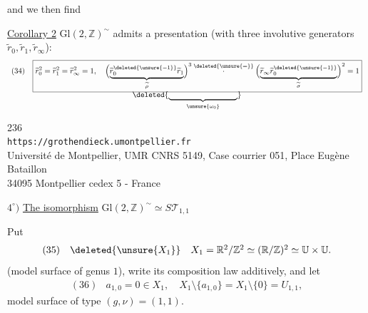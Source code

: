
and we then find

\uline{Corollary 2} $\mathrm{Gl}(2,\mathbb Z)^{\sim}$ admits a presentation (with three involutive generators $\widetilde r_0,\widetilde r_1,\widetilde r_\infty$):
\[
\begin{array}{ll}
(34)&\boxed{\widetilde r_0^2=\widetilde r_1^2=\widetilde r_\infty^2=1,\quad
\Bigl(\underbrace{\widetilde r_0^{\deleted{\unsure{-1}}}\widetilde r_1}_{\widetilde\rho}\Bigr)^3
\overset{\deleted{\unsure{=}}}{\cdot}
\Bigl(\underbrace{\widetilde r_\infty\widetilde r_0^{\deleted{\unsure{-1}}}}_{\widetilde\sigma}\Bigr)^2=1}\\[-2pt]
&\hspace{13em}\deleted{\underbrace{\hspace{9em}}_{\unsure{\omega_0}}}
\end{array}
\]


\begin{center}
236\\
\texttt{https://grothendieck.umontpellier.fr}\\
Université de Montpellier, UMR CNRS 5149, Case courrier 051, Place Eugène Bataillon\\
34095 Montpellier cedex 5 - France
\end{center}


$4^\circ)$ \uline{The isomorphism} $\mathrm{Gl}(2,\mathbb Z)^{\sim}\simeq S\mathcal T_{1,1}$

\margin{$\unsure{\checkmark}$}
Put
\[
\begin{array}{ll}
(35)&\deleted{\unsure{X_1}}\quad X_1=\mathbb R^2/\mathbb Z^2\simeq(\mathbb R/\mathbb Z)^2\simeq\mathbb U\times\mathbb U.
\end{array}
\]
(model surface of genus $1$), write its composition law additively, and let
\[
\begin{array}{ll}
(36)&a_{1,0}=0\in X_1,\quad X_1\setminus\{a_{1,0}\}=X_1\setminus\{0\}=U_{1,1},
\end{array}
\]
model surface of type $(g,\nu)=(1,1)$.

